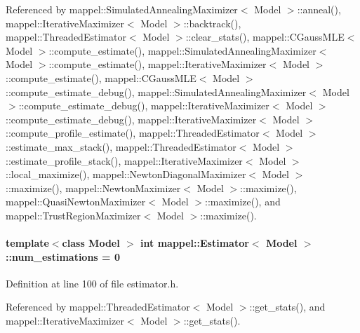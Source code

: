 Referenced by mappel\+::\+Simulated\+Annealing\+Maximizer$<$ Model $>$\+::anneal(), mappel\+::\+Iterative\+Maximizer$<$ Model $>$\+::backtrack(), mappel\+::\+Threaded\+Estimator$<$ Model $>$\+::clear\+\_\+stats(), mappel\+::\+C\+Gauss\+M\+L\+E$<$ Model $>$\+::compute\+\_\+estimate(), mappel\+::\+Simulated\+Annealing\+Maximizer$<$ Model $>$\+::compute\+\_\+estimate(), mappel\+::\+Iterative\+Maximizer$<$ Model $>$\+::compute\+\_\+estimate(), mappel\+::\+C\+Gauss\+M\+L\+E$<$ Model $>$\+::compute\+\_\+estimate\+\_\+debug(), mappel\+::\+Simulated\+Annealing\+Maximizer$<$ Model $>$\+::compute\+\_\+estimate\+\_\+debug(), mappel\+::\+Iterative\+Maximizer$<$ Model $>$\+::compute\+\_\+estimate\+\_\+debug(), mappel\+::\+Iterative\+Maximizer$<$ Model $>$\+::compute\+\_\+profile\+\_\+estimate(), mappel\+::\+Threaded\+Estimator$<$ Model $>$\+::estimate\+\_\+max\+\_\+stack(), mappel\+::\+Threaded\+Estimator$<$ Model $>$\+::estimate\+\_\+profile\+\_\+stack(), mappel\+::\+Iterative\+Maximizer$<$ Model $>$\+::local\+\_\+maximize(), mappel\+::\+Newton\+Diagonal\+Maximizer$<$ Model $>$\+::maximize(), mappel\+::\+Newton\+Maximizer$<$ Model $>$\+::maximize(), mappel\+::\+Quasi\+Newton\+Maximizer$<$ Model $>$\+::maximize(), and mappel\+::\+Trust\+Region\+Maximizer$<$ Model $>$\+::maximize().

\paragraph[{\texorpdfstring{num\+\_\+estimations}{num_estimations}}]{\setlength{\rightskip}{0pt plus 5cm}template$<$class Model $>$ int {\bf mappel\+::\+Estimator}$<$ Model $>$\+::num\+\_\+estimations = 0\hspace{0.3cm}{\ttfamily [protected]}}\hypertarget{classmappel_1_1Estimator_ab15b88435d6c50a68fac84465d950b12}{}\label{classmappel_1_1Estimator_ab15b88435d6c50a68fac84465d950b12}


Definition at line 100 of file estimator.\+h.



Referenced by mappel\+::\+Threaded\+Estimator$<$ Model $>$\+::get\+\_\+stats(), and mappel\+::\+Iterative\+Maximizer$<$ Model $>$\+::get\+\_\+stats().

